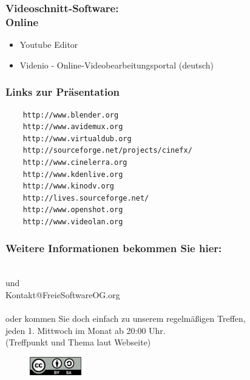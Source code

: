\begin{frame}
  \frametitle{Videoschnitt-Software:\\Online}
  \pause
  \begin{itemize}
    \item Youtube Editor
    \item Videnio - Online-Videobearbeitungsportal (deutsch)
  \end{itemize}
\end{frame}

\begin{frame}[fragile]   %
\frametitle{Links zur Präsentation}
  \begin{verbatim}
    http://www.blender.org
    http://www.avidemux.org
    http://www.virtualdub.org
    http://sourceforge.net/projects/cinefx/
    http://www.cinelerra.org
    http://www.kdenlive.org
    http://www.kinodv.org
    http://lives.sourceforge.net/
    http://www.openshot.org
    http://www.videolan.org
  \end{verbatim}
\end{frame}

\begin{frame}
\frametitle{Weitere Informationen bekommen Sie hier:}
  \begin{center}
  \Large{
    \fsog \\      %
    und \\
    Kontakt@FreieSoftwareOG.org \\~\\

    oder kommen Sie doch einfach zu unserem regelmäßigen Treffen, \\
    jeden 1. Mittwoch im Monat ab 20:00 Uhr. \\
    (Treffpunkt und Thema laut Webseite)
    }
  \end{center}
  \begin{figure}[ht]
    \centering
    \includegraphics[width=0.2\textwidth]{../gemeinsam/CC-BY-SA.png}
  \end{figure}
\end{frame}


